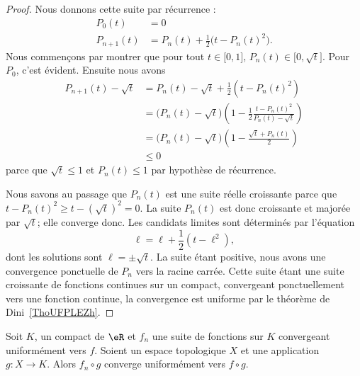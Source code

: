 \begin{proof}
	Nous donnons cette suite par récurrence :
	\begin{subequations}
		\begin{align}
			P_0(t)     & =0                                           \\
			P_{n+1}(t) & =P_n(t)+\frac{ 1 }{2}\big( t-P_n(t)^2 \big).
		\end{align}
	\end{subequations}
	Nous commençons par montrer que pour tout \( t\in \mathopen[ 0 , 1 \mathclose]\), \( P_n(t)\in\mathopen[ 0 , \sqrt{t} \mathclose]\). Pour \( P_0\), c'est évident. Ensuite nous avons
	\begin{subequations}
		\begin{align}
			P_{n+1}(t)-\sqrt{t} & =P_n(t)-\sqrt{t}+\frac{ 1 }{2}(t-P_n(t)^2)                                                       \\
			                    & =\big( P_n(t)-\sqrt{t} \big)\left( 1-\frac{ 1 }{2}\frac{ t-P_n(t)^2 }{ P_n(t)-\sqrt{t} } \right) \\
			                    & =\big( P_n(t)-\sqrt{t} \big)\left( 1-\frac{ \sqrt{t}+P_n(t) }{2} \right)                         \\
			                    & \leq 0
		\end{align}
	\end{subequations}
	parce que \( \sqrt{t} \leq 1\) et \( P_n(t)\leq 1\) par hypothèse de récurrence.

	Nous savons au passage que \( P_n(t)\) est une suite réelle croissante parce que \( t-P_n(t)^2\geq t-(\sqrt{t})^2=0\). La suite \( P_n(t)\) est donc croissante et majorée par \( \sqrt{t}\); elle converge donc. Les candidats limites sont déterminés par l'équation
	\begin{equation}
		\ell=\ell+\frac{ 1 }{2}(t-\ell^2),
	\end{equation}
	dont les solutions sont \( \ell=\pm\sqrt{t}\). La suite étant positive, nous avons une convergence ponctuelle de \( P_n\) vers la racine carrée. Cette suite étant une suite croissante de fonctions continues sur un compact, convergeant ponctuellement vers une fonction continue, la convergence est uniforme par le théorème de Dini~\ref{ThoUFPLEZh}.
\end{proof}

\begin{lemma}           \label{LemUuxcqY}
	Soit \( K\), un compact de \( \eR\) et \( f_n\) une suite de fonctions sur \( K\) convergeant uniformément vers \( f\). Soient un espace topologique \( X\) et une application \( g\colon X\to K\). Alors \( f_n\circ g\) converge uniformément vers \( f\circ g\).
\end{lemma}

